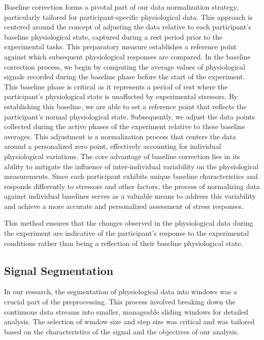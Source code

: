Baseline correction forms a pivotal part of our data normalization strategy, particularly tailored for participant-specific physiological data. This approach is centered around the concept of adjusting the data relative to each participant's baseline physiological state, captured during a rest period prior to the experimental tasks. This preparatory measure establishes a reference point against which subsequent physiological responses are compared.
In the baseline correction process, we begin by computing the average values of physiological signals recorded during the baseline phase before the start of the experiment. This baseline phase is critical as it represents a period of rest where the participant's physiological state is unaffected by experimental stressors. By establishing this baseline, we are able to set a reference point that reflects the participant's normal physiological state. Subsequently, we adjust the data points collected during the active phases of the experiment relative to these baseline averages. This adjustment is a normalization process that centers the data around a personalized zero point, effectively accounting for individual physiological variations. The core advantage of baseline correction lies in its ability to mitigate the influence of inter-individual variability on the physiological measurements. Since each participant exhibits unique baseline characteristics and responds differently to stressors and other factors, the process of normalizing data against individual baselines serves as a valuable means to address this variability and achieve a more accurate and personalized assessment of stress responses.

This method ensures that the changes observed in the physiological data during the experiment are indicative of the participant's response to the experimental conditions rather than being a reflection of their baseline physiological state.

\subsection*{Signal Segmentation}
\label{sec:signal_segmentation}
In our research, the segmentation of physiological data into windows was a crucial part of the preprocessing. This process involved breaking down the continuous data streams into smaller, manageable sliding windows for detailed analysis. The selection of window size and step size was critical and was tailored based on the characteristics of the signal and the objectives of our analysis.

